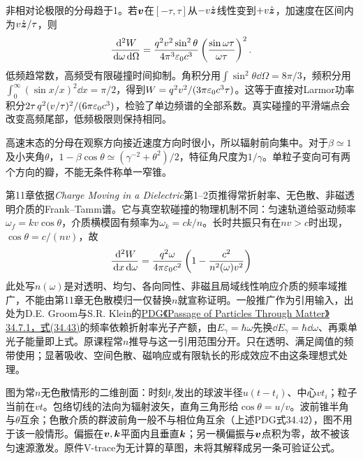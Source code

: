 非相对论极限的分母趋于1。若$\boldsymbol{v}$在$[-\tau,\tau]$从$-v\hat{\boldsymbol{z}}$线性变到$+v\hat{\boldsymbol{z}}$，加速度在区间内为$v\hat{\boldsymbol{z}}/\tau$，则
\[
 \frac{\,\mathrm d^2W}{\,\mathrm d\omega\,\mathrm d\Omega}
 =\frac{q^2v^2\sin^2\theta}{4\pi^3\varepsilon_0 c^3}
 \left(\frac{\sin\omega\tau}{\omega\tau}\right)^2.
\]
低频趋常数，高频受有限碰撞时间抑制。角积分用$\int\sin^2\theta\dd\Omega=8\pi/3$，频积分用$\int_0^\infty(\sin x/x)^2\dd x=\pi/2$，得到$W=q^2v^2/(3\pi\varepsilon_0 c^3\tau)$。这等于直接对Larmor功率积分$2\tau\,q^2(v/\tau)^2/(6\pi\varepsilon_0 c^3)$，检验了单边频谱的全部系数。真实碰撞的平滑端点会改变高频尾部，低频极限则保持相同。

高速末态的分母在观察方向接近速度方向时很小，所以辐射前向集中。对于$\beta\simeq1$及小夹角$\theta$，$1-\beta\cos\theta\simeq(\gamma^{-2}+\theta^2)/2$，特征角尺度为$1/\gamma$。单粒子变向可有两个方向的瓣，不能无条件称单一窄锥。

第11章依据\textit{Charge Moving in a Dielectric}第1--2页推得常折射率、无色散、非磁透明介质的Frank--Tamm谱。它与真空软碰撞的物理机制不同：匀速轨道给驱动频率$\omega_f=kv\cos\theta$，介质横模固有频率为$\omega_k=ck/n$。长时共振只有在$nv>c$时出现，$\cos\theta=c/(nv)$，故
\[
 \frac{\,\mathrm d^2W}{\,\mathrm d x\,\mathrm d\omega}
 =\frac{q^2\omega}{4\pi\varepsilon_0 c^2}
 \left(1-\frac{c^2}{n^2(\omega)v^2}\right)
\]
此处写$n(\omega)$是对透明、均匀、各向同性、非磁且局域线性响应介质的频率域推广，不能由第11章无色散模归一仅替换$n$就宣称证明。一般推广作为引用输入，出处为D.E. Groom与S.R. Klein的\href{https://pdg.lbl.gov/2024/reviews/rpp2024-rev-passage-particles-matter.pdf}{PDG《Passage of Particles Through Matter》34.7.1，式(34.43)}的频率依赖折射率光子产额，由$E_\gamma=\hbar\omega$先换$\dd E_\gamma=\hbar\dd\omega$、再乘单光子能量即上式。原课程常$n$推导与这一引用范围分开。只在透明、满足阈值的频带使用；显著吸收、空间色散、磁响应或有限轨长的形成效应不由这条理想式处理。\begin{center}
\end{center}
图为常$n$无色散情形的二维剖面：时刻$t_i$发出的球波半径$u(t-t_i)$、中心$vt_i$；粒子当前在$vt$。包络切线的法向为辐射波矢，直角三角形给$\cos\theta=u/v$。波前锥半角与$\theta$互余；色散介质的群波前角一般不与相位角互余（上述PDG式34.42），图不用于该一般情形。偏振在$\boldsymbol{v},\boldsymbol{k}$平面内且垂直$\boldsymbol{k}$；另一横偏振与$\boldsymbol{v}$点积为零，故不被该匀速源激发。原件V-trace为无计算的草图，未将其解释成另一条可验证公式。

